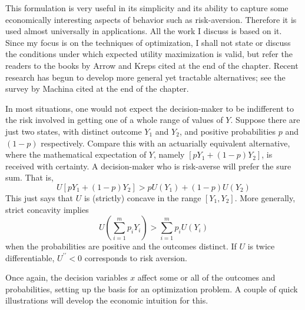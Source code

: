 This formulation is very useful in its simplicity and its ability to capture some economically interesting aspects of behavior such as risk-aversion. Therefore it is used almost universally in applications. All the work I discuss is based on it. Since my focus is on the techniques of optimization, I shall not state or discuss the conditions under which expected utility maximization is valid, but refer the readers to the books by Arrow and Kreps cited at the end of the chapter. Recent research has begun to develop more general yet tractable alternatives; see the survey by Machina cited at the end of the chapter.

In most situations, one would not expect the decision-maker to be indifferent to the risk involved in getting one of a whole range of values of $Y$. Suppose there are just two states, with distinct outcome $Y_1$ and $Y_2$, and positive probabilities $p$ and $(1-p)$ respectively. Compare this with an actuarially equivalent alternative, where the mathematical expectation of $Y$, namely $[pY_1 +(1-p)Y_2]$, is received with certainty. A decision-maker who is risk-averse will prefer the sure sum. That is,
\begin{equation*}
U[ pY_1 +(1-p)Y_2  ] > p U(Y_1) +(1-p)U(Y_2)
\end{equation*} 
This just says that $U$ is (strictly) concave in the range $[Y_1, Y_2]$. More generally, strict concavity implies
\begin{equation} \label{equa9.2}
U(\sum\limits_{i=1}^m  p_i Y_i) > \sum\limits_{i=1}^m p_i U(Y_i)
\end{equation}
when the probabilities are positive and the outcomes distinct. If $U$ is twice differentiable, $U^{\prime \prime} <0 $ corresponds to risk aversion.

Once again, the decision variables $x$ affect some or all of the outcomes and probabilities, setting up the basis for an optimization problem. A couple of quick illustrations will develop the economic intuition for this.

